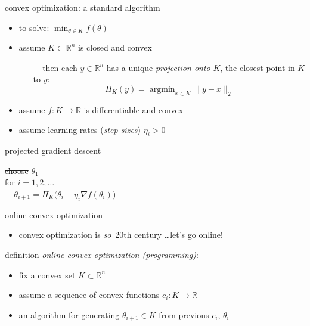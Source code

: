 \documentclass[xcolor={svgnames},
               hyperref={colorlinks,citecolor=DeepPink4,linkcolor=FireBrick,urlcolor=Maroon},
               usepdftitle=false]  %
               {beamer}
\newcommand{\grad}{\nabla}
\newcommand{\argmin}{\operatorname{argmin}}
\newcommand{\RR}{\mathbb{R}}
\newcommand{\ds}{\displaystyle}
\begin{document}
\begin{frame}{convex optimization: a standard algorithm}

\begin{itemize}
\item to solve: \quad $\ds \min_{\theta \in K} f(\theta)$
\item assume $K\subset \RR^n$ is closed and convex
    \begin{itemize}
    \item[$-$] then each $y\in \RR^n$ has a unique \emph{projection onto } $K$, the closest point in $K$ to $y$:
    $$\Pi_K(y) = \argmin_{x\in K} \|y - x\|_2$$
    \end{itemize}
\item assume $f:K\to \RR$ is differentiable and convex
\item assume learning rates (\emph{step sizes}) $\eta_i>0$
\end{itemize}

\begin{block}{projected gradient descent}

\begin{pseudo*}
\st{choose} $\theta_1$ \\
for $i = 1,2,\dots$ \\+
    $\theta_{i+1} = \Pi_K \big(\theta_i - \eta_i \grad f(\theta_i)\big)$
\end{pseudo*}
\end{block}
\end{frame}


\begin{frame}{online convex optimization}

\begin{itemize}
\item convex optimization is \emph{so}\, 20th century \dots let's go online!
\end{itemize}

\begin{block}{definition}
\emph{online convex optimization (programming)}:

\begin{itemize}
\item fix a convex set $K\subset \RR^n$
\item assume a sequence of convex functions $c_i:K\to \RR$
\item an algorithm for generating $\theta_{i+1} \in K$ from previous $c_i$, $\theta_i$
\end{itemize}
\end{block}
\end{frame}
\end{document}
